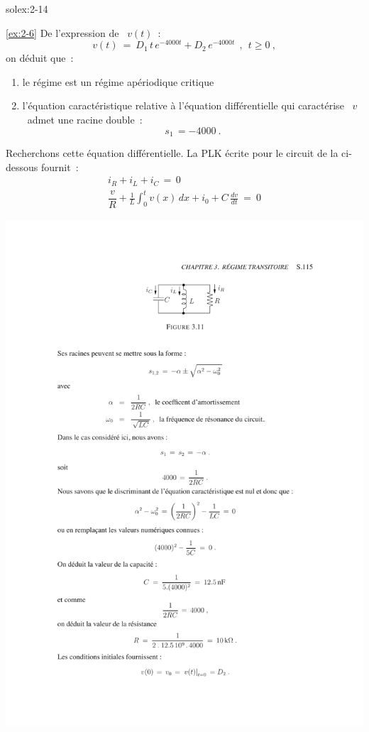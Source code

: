 \begin{exwithsol}{solex:2-14}
\begin{solexercise}{\ref{ex:2-6}}
	\label{solex:2-6}
De l'expression de \ $v(t)$~:
\[ v(t) \: = \: D_1\, t\, e^{-4000t} + D_2\, e^{-4000t}~~, ~~t\geq 0~, \]
on d\'eduit que~:
\begin{enumerate}
	\item le r\'egime est un r\'egime ap\'eriodique critique
	\item l'\'equation caract\'eristique relative \`a l'\'equation diff\'erentielle
	qui caract\'erise \ $v$ \ admet une racine double~:
	\[ s_1 \, = -4000~. \]
\end{enumerate}
Recherchons cette \'equation diff\'erentielle.
La PLK \'ecrite pour le circuit de la ci-dessous fournit~:
\[ \begin{array}{c}
i_R + i_L + i_C \, = \, 0\\[3mm]
\dfrac{v}{R} + {\displaystyle \frac{1}{L}} {\displaystyle \int^t_0} v(x) \, dx 
+ i_0 + C\, {\displaystyle \frac{dv}{dt}} \: = \: 0\end{array} \]
\begin{center}
	\includegraphics[width=\linewidth]{sol_exercices/ex3-6}
\end{center}


\end{solexercise}
\end{exwithsol}
